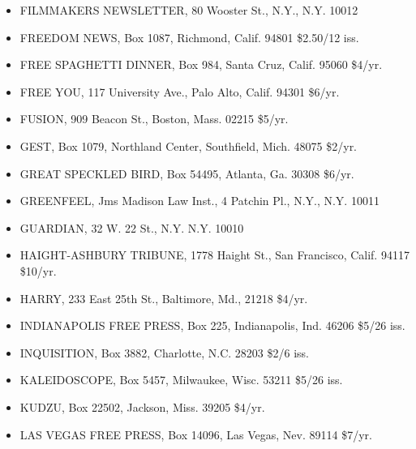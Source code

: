 \documentclass[11pt,twoside,a4paper]{book}
\begin{document}
\begin{minipage}[t]{0.20\textwidth}
\begin{scriptsize}
\begin{itemize}
	\item[] FILMMAKERS NEWSLETTER, 80 Wooster St., N.Y., N.Y. 10012 
	\item[] FREEDOM NEWS, Box 1087, Richmond, Calif. 94801 \$2.50/12 iss. 
	\item[] FREE SPAGHETTI DINNER, Box 984, Santa Cruz, Calif. 95060 \$4/yr. 
	\item[] FREE YOU, 117 University Ave., Palo Alto, Calif. 94301 \$6/yr. 
	\item[] FUSION, 909 Beacon St., Boston, Mass. 02215 \$5/yr. 
	\item[] GEST, Box 1079, Northland Center, 	Southfield, Mich. 48075 \$2/yr. 
	\item[] GREAT SPECKLED BIRD, Box 54495, Atlanta, Ga. 30308 \$6/yr. 
	\item[] GREENFEEL, Jms Madison Law Inst., 4 Patchin Pl., N.Y., N.Y. 10011 
	\item[] GUARDIAN, 32 W. 22 St., N.Y. N.Y. 10010
	\item[] HAIGHT-ASHBURY TRIBUNE, 1778 Haight St., San 	Francisco, Calif.	94117 \$10/yr. 
	\item[] HARRY, 233 East 25th St., Baltimore, Md., 21218 \$4/yr. 
	\item[] INDIANAPOLIS FREE PRESS, Box 225, Indianapolis, Ind. 46206	\$5/26 iss. 
	\item[] INQUISITION, Box 3882, Charlotte, N.C. 28203 \$2/6 iss.
	\item[] KALEIDOSCOPE, Box 5457, Milwaukee, Wisc. 53211 \$5/26 iss. 
	\item[] KUDZU, Box 22502, Jackson, Miss. 39205 \$4/yr. 
	\item[] LAS VEGAS FREE PRESS, Box 14096, Las Vegas, Nev. 89114 \$7/yr.
\end{itemize}
\end{scriptsize}
\end{minipage}\hfill
\end{document}
